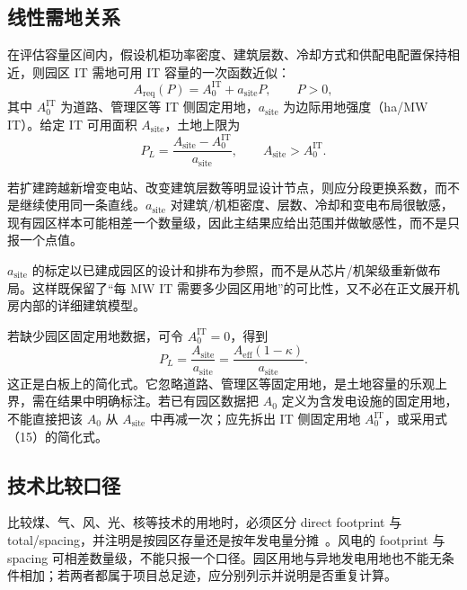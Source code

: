 \documentclass{mcmthesis}
\begin{document}
\subsection{线性需地关系}

在评估容量区间内，假设机柜功率密度、建筑层数、冷却方式和供配电配置保持相近，则园区 IT 需地可用 IT 容量的一次函数近似：
\begin{equation}
A_{\mathrm{req}}(P)=A_0^{\mathrm{IT}}+a_{\mathrm{site}}P,\qquad P>0,
\tag{13}
\end{equation}
其中 \(A_0^{\mathrm{IT}}\) 为道路、管理区等 IT 侧固定用地，\(a_{\mathrm{site}}\) 为边际用地强度（ha/MW IT）。给定 IT 可用面积 \(A_{\mathrm{site}}\)，土地上限为
\begin{equation}
P_L=\frac{A_{\mathrm{site}}-A_0^{\mathrm{IT}}}{a_{\mathrm{site}}},\qquad A_{\mathrm{site}}>A_0^{\mathrm{IT}}.
\tag{14}
\end{equation}

若扩建跨越新增变电站、改变建筑层数等明显设计节点，则应分段更换系数，而不是继续使用同一条直线。\(a_{\mathrm{site}}\) 对建筑/机柜密度、层数、冷却和变电布局很敏感，现有园区样本可能相差一个数量级，因此主结果应给出范围并做敏感性，而不是只报一个点值。

\(a_{\mathrm{site}}\) 的标定以已建成园区的设计和排布为参照，而不是从芯片/机架级重新做布局。这样既保留了“每 MW IT 需要多少园区用地”的可比性，又不必在正文展开机房内部的详细建筑模型。

若缺少园区固定用地数据，可令 \(A_0^{\mathrm{IT}}=0\)，得到
\begin{equation}
P_L=\frac{A_{\mathrm{site}}}{a_{\mathrm{site}}}
=\frac{A_{\mathrm{eff}}(1-\kappa)}{a_{\mathrm{site}}}.
\tag{15}
\end{equation}
这正是白板上的简化式。它忽略道路、管理区等固定用地，是土地容量的乐观上界，需在结果中明确标注。若已有园区数据把 \(A_0\) 定义为含发电设施的固定用地，不能直接把该 \(A_0\) 从 \(A_{\mathrm{site}}\) 中再减一次；应先拆出 IT 侧固定用地 \(A_0^{\mathrm{IT}}\)，或采用式（15）的简化式。

\subsection{技术比较口径}

比较煤、气、风、光、核等技术的用地时，必须区分 direct footprint 与 total/spacing，并注明是按园区存量还是按年发电量分摊~\cite{lovering2022,nrel2009,nrel2013}。风电的 footprint 与 spacing 可相差数量级，不能只报一个口径。园区用地与异地发电用地也不能无条件相加；若两者都属于项目总足迹，应分别列示并说明是否重复计算。
\end{document}
